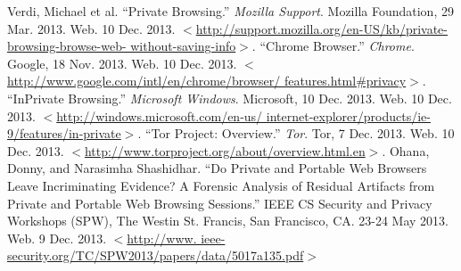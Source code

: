\documentclass[pdftex,letterpaper,titlepage,12pt]{article}
\begin{document}
  \singlespacing
  \begin{thebibliography}{9}
      Verdi, Michael et al. ``Private Browsing.'' \emph{Mozilla Support}. 
      Mozilla Foundation, 29 Mar. 2013. Web. 10 Dec. 2013. 
      $<$\url{http://support.mozilla.org/en-US/kb/private-browsing-browse-web-
      without-saving-info}$>$.
      ``Chrome Browser.'' \emph{Chrome}. Google, 18 Nov. 2013. Web. 10 Dec. 
      2013. $<$\url{http://www.google.com/intl/en/chrome/browser/
      features.html#privacy}$>$.
      ``InPrivate Browsing.'' \emph{Microsoft Windows}. Microsoft, 10 Dec. 
      2013. Web. 10 Dec. 2013. $<$\url{http://windows.microsoft.com/en-us/
      internet-explorer/products/ie-9/features/in-private}$>$.
      ``Tor Project: Overview.'' \emph{Tor}. Tor, 7 Dec. 2013. Web. 10 Dec. 
      2013. $<$\url{http://www.torproject.org/about/overview.html.en}$>$. 
      Ohana, Donny, and Narasimha Shashidhar. ``Do Private and Portable Web 
      Browsers Leave Incriminating Evidence? A Forensic Analysis of Residual 
      Artifacts from Private and Portable Web Browsing Sessions.'' IEEE CS 
      Security and Privacy Workshops (SPW), The Westin St. Francis, 
      San Francisco, CA. 23-24 May 2013. Web. 9 Dec. 2013. $<$\url{http://www.
      ieee-security.org/TC/SPW2013/papers/data/5017a135.pdf}$>$

  \end{thebibliography}
\end{document}
